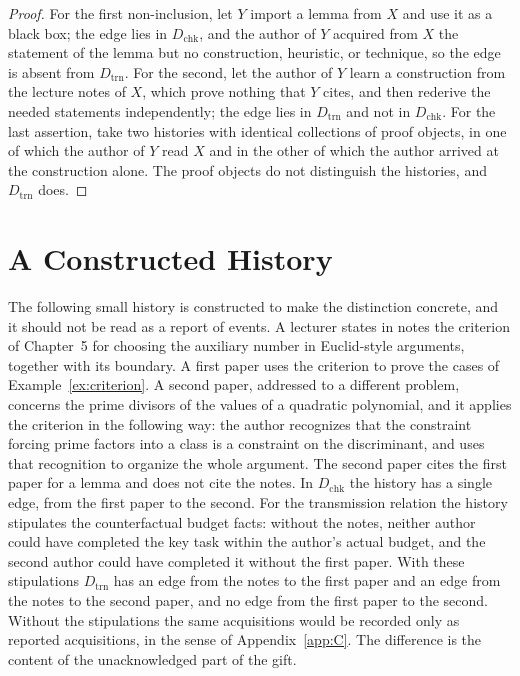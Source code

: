 \documentclass[11pt]{book}
\theoremstyle{definition}
\theoremstyle{remark}
\begin{document}
\begin{proof}
For the first non-inclusion, let $Y$ import a lemma from $X$ and use it as a black box; the edge lies in $D_{\mathrm{chk}}$, and the author of $Y$ acquired from $X$ the statement of the lemma but no construction, heuristic, or technique, so the edge is absent from $D_{\mathrm{trn}}$. For the second, let the author of $Y$ learn a construction from the lecture notes of $X$, which prove nothing that $Y$ cites, and then rederive the needed statements independently; the edge lies in $D_{\mathrm{trn}}$ and not in $D_{\mathrm{chk}}$. For the last assertion, take two histories with identical collections of proof objects, in one of which the author of $Y$ read $X$ and in the other of which the author arrived at the construction alone. The proof objects do not distinguish the histories, and $D_{\mathrm{trn}}$ does.
\end{proof}

\section{A Constructed History}

The following small history is constructed to make the distinction concrete, and it should not be read as a report of events. A lecturer states in notes the criterion of Chapter~5 for choosing the auxiliary number in Euclid-style arguments, together with its boundary. A first paper uses the criterion to prove the cases of Example~\ref{ex:criterion}. A second paper, addressed to a different problem, concerns the prime divisors of the values of a quadratic polynomial, and it applies the criterion in the following way: the author recognizes that the constraint forcing prime factors into a class is a constraint on the discriminant, and uses that recognition to organize the whole argument. The second paper cites the first paper for a lemma and does not cite the notes. In $D_{\mathrm{chk}}$ the history has a single edge, from the first paper to the second. For the transmission relation the history stipulates the counterfactual budget facts: without the notes, neither author could have completed the key task within the author's actual budget, and the second author could have completed it without the first paper. With these stipulations $D_{\mathrm{trn}}$ has an edge from the notes to the first paper and an edge from the notes to the second paper, and no edge from the first paper to the second. Without the stipulations the same acquisitions would be recorded only as reported acquisitions, in the sense of Appendix~\ref{app:C}. The difference is the content of the unacknowledged part of the gift.
\end{document}
